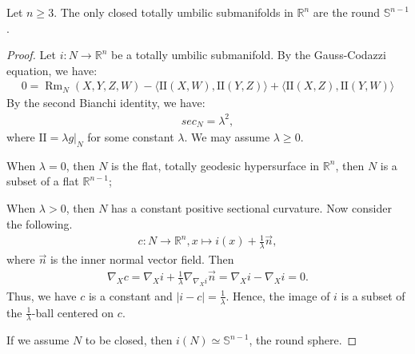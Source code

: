 \documentclass[10pt,a4paper]{amsart}
\begin{document}
\begin{theorem}\label{tus in Rn}
Let $n\geq 3$. The only closed totally umbilic submanifolds in $\mathbb{R}^n$ are the round $\mathbb{S}^{n-1}$.     
\end{theorem}

\begin{proof}
    Let $i: N\to \mathbb{R}^n$ be a totally umbilic submanifold. By the Gauss-Codazzi equation, we have:
    \begin{align*}
        0 = \operatorname{Rm}_N(X,Y,Z,W) - \langle \text{II}(X,W), \text{II}(Y,Z)\rangle + \langle \text{II}(X,Z), \text{II}(Y,W)\rangle
    \end{align*}
    By the second Bianchi identity, we have:
    \begin{align*}
        sec_N = \lambda^2,
    \end{align*}
    where $\text{II} = \lambda g|_N$ for some constant $\lambda$. We may assume $\lambda\geq 0$.

    When $\lambda = 0$, then $N$ is the flat, totally geodesic hypersurface in $\mathbb{R}^n$, then $N$ is a subset of a flat $\mathbb{R}^{n-1}$;

    When $\lambda > 0$, then $N$ has a constant positive sectional curvature. Now consider the following.
    \begin{align*}
        c: N\to \mathbb{R}^n, x\mapsto i(x) + \frac{1}{\lambda}\vec{n},
    \end{align*}
    where $\vec{n}$ is the inner normal vector field. Then
    \begin{align*}
       \nabla_X c = \nabla_X i + \frac{1}{\lambda}\nabla_{\nabla_X i} \vec{n}  = \nabla_X i - \nabla_X i = 0 .
    \end{align*}
    Thus, we have $c$ is a constant and $|i - c| = \frac{1}{\lambda}$. Hence, the image of $i$ is a subset of the $\frac{1}{\lambda}$-ball centered on $c$. 

    If we assume $N$ to be closed, then $i(N)\simeq \mathbb{S}^{n-1}$, the round sphere.
\end{proof}
\end{document}
